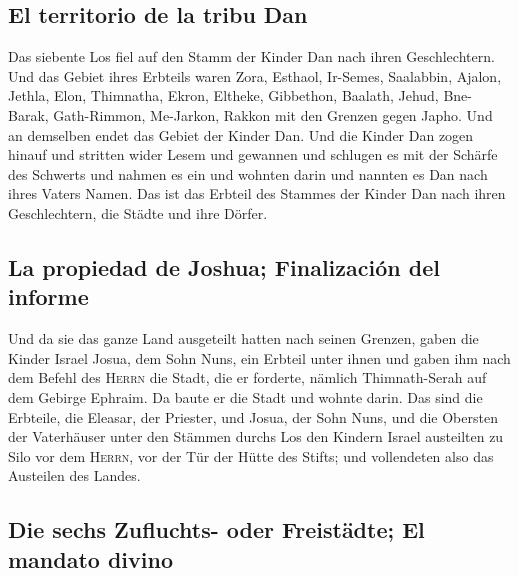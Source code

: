 \hypertarget{el-territorio-de-la-tribu-dan}{%
\subsection{El territorio de la tribu
Dan}\label{el-territorio-de-la-tribu-dan}}

 Das siebente Los fiel auf den Stamm der Kinder Dan nach
ihren Geschlechtern.  Und das Gebiet ihres Erbteils waren
Zora, Esthaol, Ir-Semes,  Saalabbin, Ajalon, Jethla,
 Elon, Thimnatha, Ekron,  Eltheke,
Gibbethon, Baalath,  Jehud, Bne-Barak, Gath-Rimmon,
 Me-Jarkon, Rakkon mit den Grenzen gegen Japho.
 Und an demselben endet das Gebiet der Kinder Dan. Und
die Kinder Dan zogen hinauf und stritten wider Lesem und gewannen und
schlugen es mit der Schärfe des Schwerts und nahmen es ein und wohnten
darin und nannten es Dan nach ihres Vaters Namen.  Das
ist das Erbteil des Stammes der Kinder Dan nach ihren Geschlechtern, die
Städte und ihre Dörfer.

\hypertarget{la-propiedad-de-joshua-finalizaciuxf3n-del-informe}{%
\subsection{La propiedad de Joshua; Finalización del
informe}\label{la-propiedad-de-joshua-finalizaciuxf3n-del-informe}}

 Und da sie das ganze Land ausgeteilt hatten nach seinen
Grenzen, gaben die Kinder Israel Josua, dem Sohn Nuns, ein Erbteil unter
ihnen  und gaben ihm nach dem Befehl des \textsc{Herrn}
die Stadt, die er forderte, nämlich Thimnath-Serah auf dem Gebirge
Ephraim. Da baute er die Stadt und wohnte darin.  Das
sind die Erbteile, die Eleasar, der Priester, und Josua, der Sohn Nuns,
und die Obersten der Vaterhäuser unter den Stämmen durchs Los den
Kindern Israel austeilten zu Silo vor dem \textsc{Herrn}, vor der Tür
der Hütte des Stifts; und vollendeten also das Austeilen des Landes.

\hypertarget{die-sechs-zufluchts--oder-freistuxe4dte-el-mandato-divino}{%
\subsection{Die sechs Zufluchts- oder Freistädte; El mandato
divino}\label{die-sechs-zufluchts--oder-freistuxe4dte-el-mandato-divino}}

